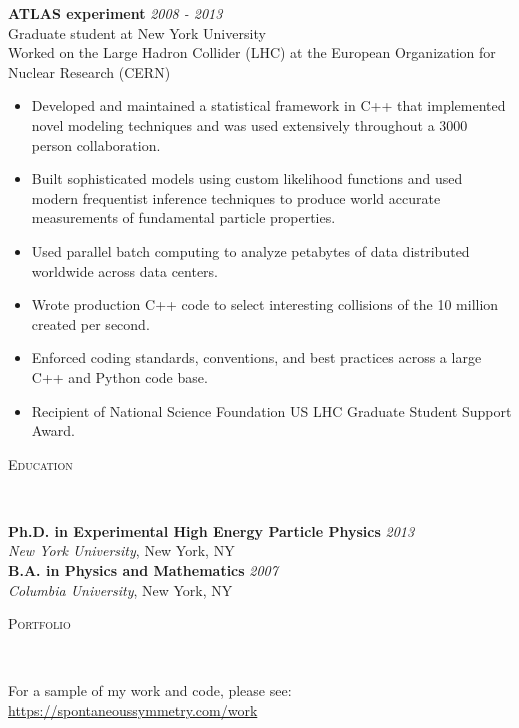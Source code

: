 \documentclass[9pt]{article}
\newenvironment{changemargin}[2]{%
  \begin{list}{}{%
    \setlength{\topsep}{0pt}%
    \setlength{\leftmargin}{#1}%
    \setlength{\rightmargin}{#2}%
    \setlength{\listparindent}{\parindent}%
    \setlength{\itemindent}{\parindent}%
    \setlength{\parsep}{\parskip}%
  }%
  \item[]}{\end{list}
}
\newcommand{\lineover}{
  \begin{changemargin}{-0.05in}{-0.05in}
    \vspace*{-8pt}
    \hrulefill \\
    \vspace*{-2pt}
  \end{changemargin}
}
\newcommand{\header}[1]{
  \begin{changemargin}{-0.5in}{-0.5in}
    \scshape{#1}\\
    \lineover
  \end{changemargin}
}
\newenvironment{body} {
  \vspace*{-16pt}
\begin{changemargin}{-0.25in}{-0.5in}
  }
{\end{changemargin}
}
\begin{document}
\begin{body}
        \medskip

        \textbf{ATLAS experiment} \hfill \emph{2008 - 2013}\\
        Graduate student at New York University \\
        Worked on the Large Hadron Collider (LHC) at the European Organization for Nuclear Research (CERN) \\
        \medskip

        \begin{itemize}

        \item Developed and maintained a statistical framework in C++ that implemented novel modeling techniques and was used extensively throughout a 3000 person collaboration.

        \item Built sophisticated models using custom likelihood functions and used modern frequentist inference techniques to produce world accurate measurements of fundamental particle properties.

        \item Used parallel batch computing to analyze petabytes of data distributed worldwide across data centers.

        \item Wrote production C++ code to select interesting collisions of the 10 million created per second.
         
        \item Enforced coding standards, conventions, and best practices across a large C++ and Python code base.

        \item Recipient of National Science Foundation US LHC Graduate Student Support Award.

        \end{itemize}

\end{body}

\smallskip

\header{Education}

\begin{body}
  \vspace{14pt}
  \textbf{Ph.D. in Experimental High Energy Particle Physics }{} \hfill \emph{2013}{} \\
  \emph{New York University}, New York, NY{} \\
  \medskip
  \textbf{B.A. in Physics and Mathematics} \hfill \emph{2007} \\
  \emph{Columbia University}, New York, NY\\
\end{body}


\header{Portfolio}

\begin{body}
  \vspace{14pt}
  For a sample of my work and code, please see: {\url{https://spontaneoussymmetry.com/work}}
\end{body}
\end{document}
